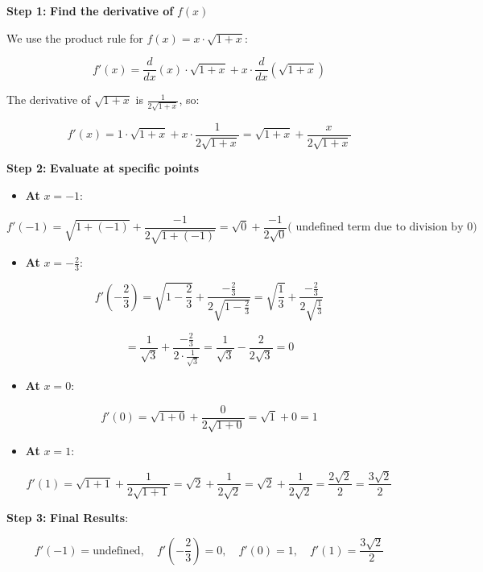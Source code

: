 \documentclass[
]{book}
\providecommand{\tightlist}{%
  \setlength{\itemsep}{0pt}\setlength{\parskip}{0pt}}
\begin{document}
\textbf{Step 1:} \textbf{Find the derivative of} \(f(x)\)

We use the product rule for \(f(x) = x \cdot \sqrt{1+x}\):

\[
f'(x) = \frac{d}{dx} \left( x \right) \cdot \sqrt{1+x} + x \cdot \frac{d}{dx} \left( \sqrt{1+x} \right)
\]

The derivative of \(\sqrt{1+x}\) is \(\frac{1}{2\sqrt{1+x}}\), so:

\[
f'(x) = 1 \cdot \sqrt{1+x} + x \cdot \frac{1}{2\sqrt{1+x}} = \sqrt{1+x} + \frac{x}{2\sqrt{1+x}}
\]

\textbf{Step 2:} \textbf{Evaluate at specific points}

\begin{itemize}
\tightlist
\item
  \textbf{At} \(x = -1\):
\end{itemize}

\[
f'(-1) = \sqrt{1+(-1)} + \frac{-1}{2\sqrt{1+(-1)}} = \sqrt{0} + \frac{-1}{2\sqrt{0}} \text{( undefined term due to division by 0)}
\]

\begin{itemize}
\tightlist
\item
  \textbf{At} \(x = -\frac{2}{3}\):
\end{itemize}

\[
f'\left( -\frac{2}{3} \right) = \sqrt{1 - \frac{2}{3}} + \frac{-\frac{2}{3}}{2\sqrt{1-\frac{2}{3}}} = \sqrt{\frac{1}{3}} + \frac{-\frac{2}{3}}{2\sqrt{\frac{1}{3}}}
\]

\[
= \frac{1}{\sqrt{3}} + \frac{-\frac{2}{3}}{2 \cdot \frac{1}{\sqrt{3}}} = \frac{1}{\sqrt{3}} - \frac{2}{2\sqrt{3}} = 0
\]

\begin{itemize}
\tightlist
\item
  \textbf{At} \(x = 0\):
\end{itemize}

\[
f'(0) = \sqrt{1+0} + \frac{0}{2\sqrt{1+0}} = \sqrt{1} + 0 = 1
\]

\begin{itemize}
\tightlist
\item
  \textbf{At} \(x = 1\):
\end{itemize}

\[
f'(1) = \sqrt{1+1} + \frac{1}{2\sqrt{1+1}} = \sqrt{2} + \frac{1}{2\sqrt{2}} = \sqrt{2} + \frac{1}{2\sqrt{2}} = \frac{2\sqrt{2}}{2} = \frac{3\sqrt{2}}{2}
\]

\textbf{Step 3:} \textbf{Final Results}:

\[
f'(-1) = \text{undefined}, \quad f'\left( -\frac{2}{3} \right) = 0, \quad f'(0) = 1, \quad f'(1) = \frac{3\sqrt{2}}{2}
\]
\end{document}
